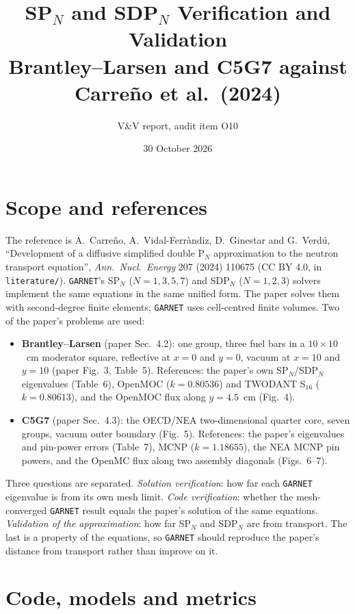 \documentclass[a4paper,10pt]{article}
\title{\textbf{SP$_N$ and SDP$_N$ Verification and Validation}\\
\large Brantley--Larsen and C5G7 against Carre\~no et al.\ (2024)}
\author{\garnet{} V\&V report, audit item O10}
\date{30 October 2026}
\newcommand{\garnet}{\texttt{GARNET}}
\newcommand{\code}[1]{\texttt{#1}}
\begin{document}
\maketitle



\section{Scope and references}

The reference is A.~Carre\~no, A.~Vidal-Ferr\`andiz, D.~Ginestar and G.~Verd\'u,
``Development of a diffusive simplified double P$_N$ approximation to the
neutron transport equation'', \emph{Ann.\ Nucl.\ Energy} 207 (2024) 110675
(CC BY 4.0, in \code{literature/}). \garnet's SP$_N$ ($N = 1, 3, 5, 7$) and
SDP$_N$ ($N = 1, 2, 3$) solvers implement the same equations in the same
unified form. The paper solves them with second-degree finite elements;
\garnet{} uses cell-centred finite volumes. Two of the paper's problems are
used:

\begin{itemize}
\item \textbf{Brantley--Larsen} (paper Sec.~4.2): one group, three fuel bars
  in a $10 \times 10$~cm moderator square, reflective at $x = 0$ and $y = 0$,
  vacuum at $x = 10$ and $y = 10$ (paper Fig.~3, Table~5). References: the
  paper's own SP$_N$/SDP$_N$ eigenvalues (Table~6), OpenMOC
  ($k = 0.80536$) and TWODANT S$_{16}$ ($k = 0.80613$), and the OpenMOC flux
  along $y = 4.5$~cm (Fig.~4).
\item \textbf{C5G7} (paper Sec.~4.3): the OECD/NEA two-dimensional
  quarter core, seven groups, vacuum outer boundary (Fig.~5). References: the
  paper's eigenvalues and pin-power errors (Table~7), MCNP
  ($k = 1.18655$), the NEA MCNP pin powers, and the OpenMC flux along two
  assembly diagonals (Figs.~6--7).
\end{itemize}

Three questions are separated. \emph{Solution verification}: how far each
\garnet{} eigenvalue is from its own mesh limit. \emph{Code verification}:
whether the mesh-converged \garnet{} result equals the paper's solution of
the same equations. \emph{Validation of the approximation}: how far SP$_N$
and SDP$_N$ are from transport. The last is a property of the equations, so
\garnet{} should reproduce the paper's distance from transport rather than
improve on it.

\section{Code, models and metrics}
\end{document}
